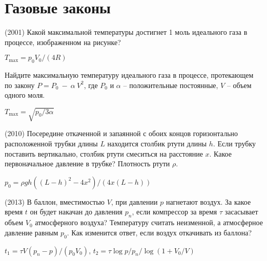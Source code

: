 \section{Газовые законы}

\begin{ex} 
(2001) Какой максимальной температуры достигнет 1 моль идеального газа в процессе, изображенном на рисунке? 
\begin{center}
\end{center}
\begin{ans}
$T_{\max}=p_0V_0/(4R)$
\end{ans}
\end{ex}

\begin{ex}
Найдите максимальную температуру идеального газа в процессе, протекающем по закону $P=P_0~-~\alpha~V^2$, где $P_0$ и $\alpha$ -- положительные постоянные, $V$ -- объем одного моля.
\begin{ans}
$T_{\max} = \sqrt{p_0/3\alpha}$
\end{ans}
\end{ex}

\begin{ex}
(2010) Посередине откаченной и запаянной с обоих концов горизонтально расположенной трубки длины $L$ находится столбик ртути длины $h$. 
Если трубку поставить вертикально, столбик ртути смеситься на расстояние $x$. Какое первоначальное давление в трубке? Плотность ртути $\rho$.
\begin{ans}
$p_0 = \rho g h \left( (L-h)^2 - 4x^2 \right)/ (4x(L-h))$
\end{ans}
\end{ex}

\begin{ex}
(2013) В баллон, вместимостью $V$, при давлении $p$ нагнетают воздух. За какое время $t$ он будет накачан до давления $p_n$, если компрессор за время $\tau$ засасывает объем $V_0$ атмосферного воздуха? 
Температуру считать неизменной, а атмосферное давление равным $p_0$. Как изменится ответ, если воздух откачивать из баллона?
\begin{ans}
$t_1 = \tau V(p_n-p)/(p_0V_0)$, $t_2 = \tau \log p/p_n /\log (1+V_0/V)$
\end{ans}
\end{ex}

